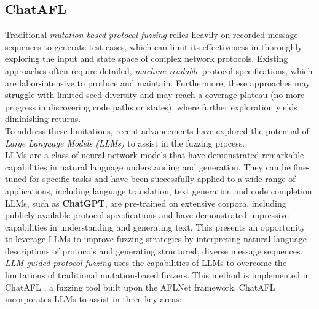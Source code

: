 \subsection{ChatAFL}
Traditional \textit{mutation-based protocol fuzzing} relies heavily on recorded message sequences to generate test cases, which can limit its effectiveness in thoroughly exploring the input and state space of complex network protocols. Existing approaches often require detailed, \textit{machine-readable} protocol specifications, which are labor-intensive to produce and maintain. Furthermore, these approaches may struggle with limited seed diversity and may reach a coverage plateau (no more progress in discovering code paths or states), where further exploration yields diminishing returns.
\\To address these limitations, recent advancements have explored the potential of \textit{Large Language Models (LLMs)} to assist in the fuzzing process.
\\LLMs are a class of neural network models that have demonstrated remarkable capabilities in natural language understanding and generation. They can be fine-tuned for specific tasks and have been successfully applied to a wide range of applications, including language translation, text generation and code completion.
\\LLMs, such as \textbf{ChatGPT}, are pre-trained on extensive corpora, including publicly available protocol specifications and have demonstrated impressive capabilities in understanding and generating text. This presents an opportunity to leverage LLMs to improve fuzzing strategies by interpreting natural language descriptions of protocols and generating structured, diverse message sequences.
\\\textit{LLM-guided protocol fuzzing} uses the capabilities of LLMs to overcome the limitations of traditional mutation-based fuzzers. This method is implemented in ChatAFL \cite{chatafl} , a fuzzing tool built upon the AFLNet framework. ChatAFL incorporates LLMs to assist in three key areas:

